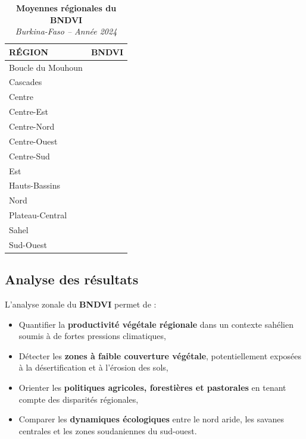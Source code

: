 \documentclass[
]{book}
\providecommand{\tightlist}{%
  \setlength{\itemsep}{0pt}\setlength{\parskip}{0pt}}
\begin{document}
\begin{table}[!t]
\caption*{
{\large \textbf{Moyennes régionales du BNDVI}} \\ 
{\small \emph{Burkina-Faso -- Année 2024}}
} 
\fontsize{12.0pt}{14.4pt}\selectfont
\begin{tabular*}{\linewidth}{@{\extracolsep{\fill}}lr}
\toprule
{RÉGION} & {BNDVI} \\ 
\midrule\addlinespace[2.5pt]
Boucle du Mouhoun & {\cellcolor[HTML]{C7E89A}{\textcolor[HTML]{000000}{0.57}}} \\ 
Cascades & {\cellcolor[HTML]{004529}{\textcolor[HTML]{FFFFFF}{0.64}}} \\ 
Centre & {\cellcolor[HTML]{FEFFE1}{\textcolor[HTML]{000000}{0.55}}} \\ 
Centre-Est & {\cellcolor[HTML]{FCFED3}{\textcolor[HTML]{000000}{0.55}}} \\ 
Centre-Nord & {\cellcolor[HTML]{F7FCB9}{\textcolor[HTML]{000000}{0.56}}} \\ 
Centre-Ouest & {\cellcolor[HTML]{F9FCC0}{\textcolor[HTML]{000000}{0.56}}} \\ 
Centre-Sud & {\cellcolor[HTML]{F9FDC4}{\textcolor[HTML]{000000}{0.56}}} \\ 
Est & {\cellcolor[HTML]{FDFED6}{\textcolor[HTML]{000000}{0.55}}} \\ 
Hauts-Bassins & {\cellcolor[HTML]{379E54}{\textcolor[HTML]{FFFFFF}{0.61}}} \\ 
Nord & {\cellcolor[HTML]{E1F3A8}{\textcolor[HTML]{000000}{0.57}}} \\ 
Plateau-Central & {\cellcolor[HTML]{FBFDCF}{\textcolor[HTML]{000000}{0.55}}} \\ 
Sahel & {\cellcolor[HTML]{FFFFE5}{\textcolor[HTML]{000000}{0.55}}} \\ 
Sud-Ouest & {\cellcolor[HTML]{3AA156}{\textcolor[HTML]{FFFFFF}{0.61}}} \\ 
\bottomrule
\end{tabular*}
\end{table}

\subsection{Analyse des résultats}\label{analyse-des-ruxe9sultats-3}

L'analyse zonale du \textbf{BNDVI} permet de :

\begin{itemize}
\tightlist
\item
  Quantifier la \textbf{productivité végétale régionale} dans un contexte sahélien soumis à de fortes pressions climatiques,
\item
  Détecter les \textbf{zones à faible couverture végétale}, potentiellement exposées à la désertification et à l'érosion des sols,
\item
  Orienter les \textbf{politiques agricoles, forestières et pastorales} en tenant compte des disparités régionales,
\item
  Comparer les \textbf{dynamiques écologiques} entre le nord aride, les savanes centrales et les zones soudaniennes du sud-ouest.
\end{itemize}
\end{document}
